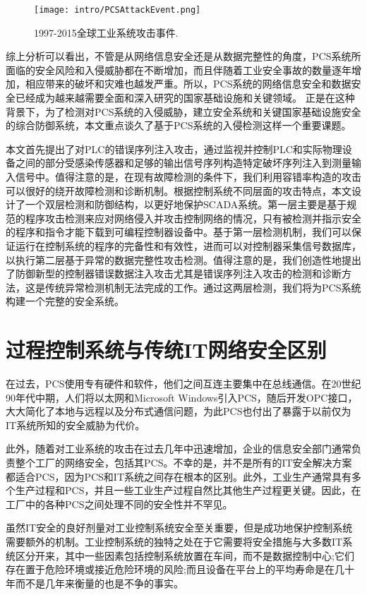 \begin{figure}[!htp]
 \centering
 \texttt{[image: intro/PCSAttackEvent.png]}
 \caption{1997-2015全球工业系统攻击事件.}
 \label{pcsattack}
\end{figure}


综上分析可以看出，不管是从网络信息安全还是从数据完整性的角度，PCS系统所面临的安全风险和入侵威胁都在不断增加，而且伴随着工业安全事故的数量逐年增加，相应带来的破坏和灾难也越发严重。所以，PCS系统的网络信息安全和数据安全已经成为越来越需要全面和深入研究的国家基础设施和关键领域。
正是在这种背景下，为了检测对PCS系统的入侵威胁，建立安全系统和关键国家基础设施安全的综合防御系统，本文重点谈久了基于PCS系统的入侵检测这样一个重要课题。

本文首先提出了对PLC的错误序列注入攻击，通过监视并控制PLC和实际物理设备之间的部分受感染传感器和足够的输出信号序列构造特定破坏序列注入到测量输入信号中。值得注意的是，在现有故障检测的条件下，我们利用容错率构造的攻击可以很好的绕开故障检测和诊断机制。根据控制系统不同层面的攻击特点，本文设计了一个双层检测和防御结构，以更好地保护SCADA系统。第一层主要是基于规范的程序攻击检测来应对网络侵入并攻击控制网络的情况，只有被检测并指示安全的程序和指令才能下载到可编程控制器设备中。基于第一层检测机制，我们可以保证运行在控制系统的程序的完备性和有效性，进而可以对控制器采集信号数据库，以执行第二层基于异常的数据完整性攻击检测。值得注意的是，我们创造性地提出了防御新型的控制器错误数据注入攻击尤其是错误序列注入攻击的检测和诊断方法，这是传统异常检测机制无法完成的工作。通过这两层检测，我们将为PCS系统构建一个完整的安全系统。

\section{过程控制系统与传统IT网络安全区别}


在过去，PCS使用专有硬件和软件，他们之间互连主要集中在总线通信。在20世纪90年代中期，人们将以太网和Microsoft Windows引入PCS，随后开发OPC接口，大大简化了本地与远程以及分布式通信问题，为此PCS也付出了暴露于以前仅为IT系统所知的安全威胁为代价。

此外，随着对工业系统的攻击在过去几年中迅速增加，企业的信息安全部门通常负责整个工厂的网络安全，包括其PCS。不幸的是，并不是所有的IT安全解决方案都适合PCS，因为PCS和IT系统之间存在根本的区别。此外，工业生产通常具有多个生产过程和PCS，并且一些工业生产过程自然比其他生产过程更关键。因此，在工厂中的各种PCS之间处理不同的安全性并不罕见。

虽然IT安全的良好剂量对工业控制系统安全至关重要，但是成功地保护控制系统需要额外的机制。工业控制系统的独特之处在于它需要将安全措施与大多数IT系统区分开来，其中一些因素包括控制系统放置在车间，而不是数据控制中心;它们存在置于危险环境或接近危险环境的风险;而且设备在平台上的平均寿命是在几十年而不是几年来衡量的也是不争的事实。

